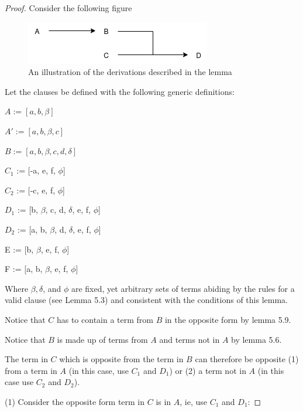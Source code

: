 \documentclass[manuscript]{acmart}
\begin{document}
    \begin{proof}

        Consider the following figure

        \begin{figure}[h]
            \includegraphics[scale=0.8]{318}
            \caption{An illustration of the derivations described in the lemma}
        \end{figure}

        Let the clauses be defined with the following generic definitions:

        $A := [a, b, \beta]$
        
        $A' := [a, b, \beta, c]$

        $B := [a, b, \beta, c, d, \delta]$

        $C_1$ := [-a, e, f, $\phi$]

        $C_2$ := [-c, e, f, $\phi$]

        $D_1$ := [b, $\beta$, c, d, $\delta$, e, f, $\phi$]

        $D_2$ := [a, b, $\beta$, d, $\delta$, e, f, $\phi$]

        E := [b, $\beta$, e, f, $\phi$]

        F := [a, b, $\beta$, e, f, $\phi$]

        Where $\beta, \delta$, and $\phi$ are fixed, yet arbitrary sets of terms 
        abiding by the rules for a valid clause (see Lemma 5.3) and consistent
        with the conditions of this lemma.

        Notice that $C$ has to contain a term from $B$ in the opposite form by 
        lemma 5.9.

        Notice that $B$ is made up of terms from $A$ and terms not in $A$
        by lemma 5.6.

        The term in $C$ which is opposite from the term in $B$ can therefore
        be opposite (1) from a term
        in $A$ (in this case, use $C_1$ and $D_1$) or (2) a 
        term not in $A$ (in this case use $C_2$ and $D_2$).
        
        (1) Consider the opposite form term in $C$ is in $A$, ie, use $C_1$
        and $D_1$:


\end{proof}
\end{document}
